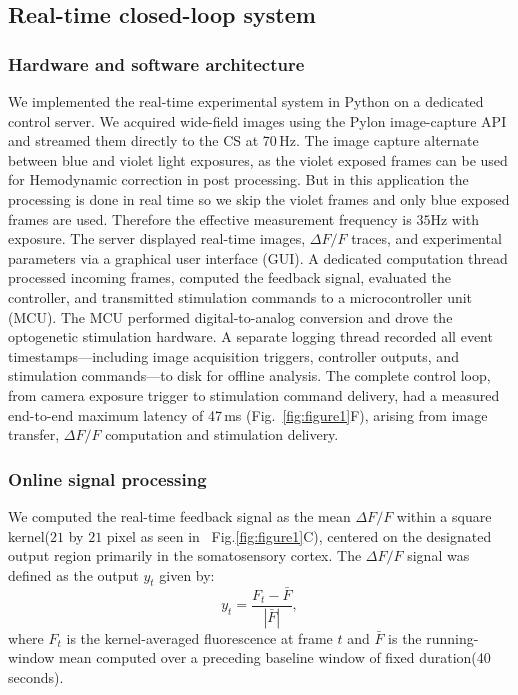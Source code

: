 \subsection*{Real-time closed-loop system}

\subsubsection*{Hardware and software architecture}

We implemented the real-time experimental system in Python on a dedicated control server.
We acquired wide-field images using the Pylon image-capture API and streamed them directly to the CS at 70\,Hz.
The image capture alternate between blue and violet light exposures, as the violet exposed frames can be used for Hemodynamic correction in post processing. But in this application the processing is done in real time so we skip the violet frames and only blue exposed frames are used. Therefore the effective measurement frequency is $35$Hz with exposure. 
The server displayed real-time images, $\Delta F/F$ traces, and experimental parameters via a graphical user interface (GUI). 
A dedicated computation thread processed incoming frames, computed the feedback signal, evaluated the controller, and transmitted stimulation commands to a microcontroller unit (MCU). 
The MCU performed digital-to-analog conversion and drove the optogenetic stimulation hardware. 
A separate logging thread recorded all event timestamps---including image acquisition triggers, controller outputs, and stimulation commands---to disk for offline analysis.
The complete control loop, from camera exposure trigger to stimulation command delivery, had a measured end-to-end  maximum latency of 47\,ms (Fig.~\ref{fig:figure1}F), arising from image transfer, $\Delta F/F$ computation and stimulation delivery.

\subsubsection*{Online signal processing}
We computed the real-time feedback signal as the mean $\Delta F/F$ within a square kernel($21$ by $21$ pixel as seen in ~Fig.\ref{fig:figure1}C), centered on the designated output region primarily in the somatosensory cortex. The $\Delta F/F$ signal was defined as the output $y_t$ given by:
%
\begin{equation}
    y_{t} = \frac{F_{t} - \bar{F}}{|\bar{F}|},
    \label{eq:dff}
\end{equation}
%
where $F_{t}$ is the kernel-averaged fluorescence at frame $t$ and $\bar{F}$ is the running-window mean computed over a preceding baseline window of fixed duration(40 seconds).

